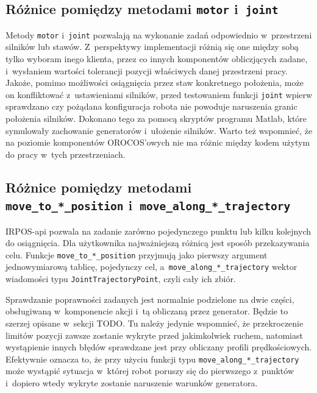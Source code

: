 \documentclass[a4paper, 12pt]{article}
\begin{document}
	\subsection{Różnice pomiędzy metodami \texttt{motor} i~\texttt{joint}}
	\label{sec:motjodiff}
	Metody \texttt{motor} i~\texttt{joint} pozwalają na wykonanie zadań odpowiednio w~przestrzeni silników lub stawów. Z~perspektywy implementacji różnią się one  między sobą tylko wyboram inego klienta, przez co innych komponentów obliczjących zadane, i~wysłaniem wartości tolerancji pozycji właściwych danej przestrzeni pracy. Jakoże, pomimo możliwości osiągnięcia przez staw konkretnego położenia, może on konfliktować z~ustawieniami silników, przed testowaniem funkcji \texttt{joint} wpierw sprawdzano czy pożądana konfiguracja robota nie powoduje naruszenia granic położenia silników. Dokonano tego za pomocą skryptów programu Matlab, które symulowały zachowanie generatorów i~ułożenie silników. Warto też wspomnieć, że na poziomie komponentów OROCOS'owych nie ma różnic między kodem użytym do pracy w~tych przestrzeniach. 
	
	\subsection{Różnice pomiędzy metodami \texttt{move\_to\_*\_position} i~\texttt{move\_along\_*\_trajectory}}
	\label{sec:postradiff}
	IRPOS-api pozwala na zadanie zarówno pojedynczego punktu lub kilku kolejnych do osiągnięcia. Dla użytkownika najważniejszą różnicą jest sposób przekazywania celu. Funkcje \linebreak \texttt{move\_to\_*\_position} przyjmują jako pierwszy argument jednowymiarową tablicę, pojedynczy cel, a~\texttt{move\_along\_*\_trajectory} wektor wiadomości typu \texttt{JointTrajectoryPoint}, czyli cały ich zbiór. 
	\par Sprawdzanie poprawności zadanych jest normalnie podzielone na dwie części, obsługiwaną w~komponencie akcji i~tą obliczaną przez generator. Będzie to szerzej opisane w~sekcji TODO. Tu należy jedynie wspomnieć, że przekroczenie limitów pozycji zawsze zostanie wykryte przed jakimkolwiek ruchem, natomiast wystąpienie innych błędów sprawdzane jest przy obliczany profili prędkościowych. Efektywnie oznacza to, że przy użyciu funkcji typu \texttt{move\_along\_*\_trajectory} może wystąpić sytuacja w~której robot poruszy się do pierwszego z~punktów i~dopiero wtedy wykryte zostanie naruszenie warunków generatora.
	
\end{document}
